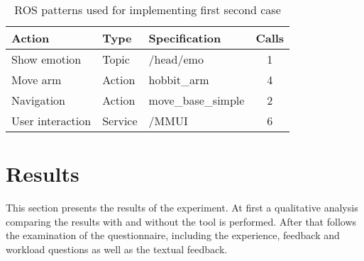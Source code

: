 \begin{table}
    \centering
    \begin{tabular}{l l l c}
        \toprule
        Action           & Type    & Specification      & Calls \\
        \midrule
        Show emotion     & Topic   & /head/emo          & 1     \\
        Move arm         & Action  & hobbit\_arm        & 4     \\
        Navigation       & Action  & move\_base\_simple & 2     \\
        User interaction & Service & /MMUI              & 6     \\
        \bottomrule
    \end{tabular}
    \caption{ROS patterns used for implementing first second case}
    \label{tab:SecondUseCaseSpecs}
\end{table}




\section{Results}
This section presents the results of the experiment. At first a qualitative analysis comparing the results with and without the tool is performed. After that follows the examination of the questionnaire, including the experience, feedback and workload questions as well as the textual feedback.

